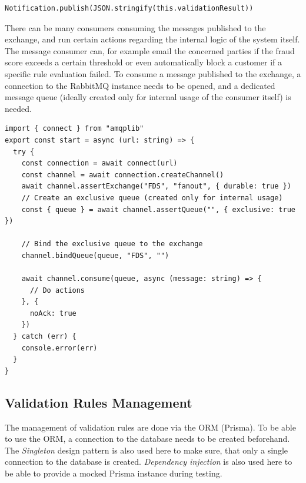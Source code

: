     \begin{lstlisting}[style=es6, caption={Publishing a validation result to the RabbitMQ exchange (TypeScript)}]
Notification.publish(JSON.stringify(this.validationResult))
    \end{lstlisting}
    
    There can be many consumers consuming the messages published to the exchange, and run certain actions regarding the internal logic of the system itself. The message consumer can, for example email the concerned parties if the fraud score exceeds a certain threshold or even automatically block a customer if a specific rule evaluation failed. To consume a message published to the exchange, a connection to the RabbitMQ instance needs to be opened, and a dedicated message queue (ideally created only for internal usage of the consumer itself) is needed. 

    \begin{lstlisting}[style=es6, caption={Consuming a message published to the RabbitMQ exchange (TypeScript)}]
import { connect } from "amqplib"
export const start = async (url: string) => {
  try {
    const connection = await connect(url)
    const channel = await connection.createChannel()
    await channel.assertExchange("FDS", "fanout", { durable: true })
    // Create an exclusive queue (created only for internal usage)
    const { queue } = await channel.assertQueue("", { exclusive: true })

    // Bind the exclusive queue to the exchange
    channel.bindQueue(queue, "FDS", "") 

    await channel.consume(queue, async (message: string) => {
      // Do actions
    }, {
      noAck: true
    })
  } catch (err) {
    console.error(err)
  }
}
    \end{lstlisting}

  \subsection{Validation Rules Management}
  
    The management of validation rules are done via the ORM (Prisma). To be able to use the ORM, a connection to the database needs to be created beforehand. The \emph{Singleton} \autocite[pp. 127-134]{gamma-1995} design pattern is also used here to make sure, that only a single connection to the database is created. \emph{Dependency injection} is also used here to be able to provide a mocked Prisma instance during testing. 


